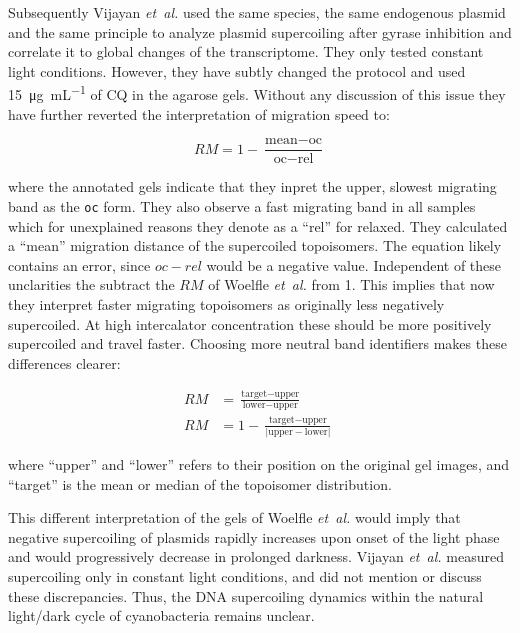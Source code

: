 \documentclass[10pt,a4]{article}
\newcommand{\ugml}{\micro\gram\per\milli\liter}
\newcommand{\etal}{\textit{et~al.}}
\begin{document}
Subsequently Vijayan \etal{} \cite{Vijayan2009} used the same species,
the same endogenous plasmid and the same principle to analyze plasmid
supercoiling after gyrase inhibition and correlate it to global
changes of the transcriptome. They only tested constant light
conditions.  However, they have subtly changed the protocol and used
\SI{15}{\ugml} of CQ in the agarose gels. Without any discussion of
this issue they have further reverted the interpretation of migration
speed to:

\begin{equation}
  RM = 1 - \frac{\text{mean} - \text{oc}}{\text{oc} - \text{rel}}
\end{equation}

where the annotated gels indicate that they inpret the upper, slowest
migrating band as the \texttt{oc} form. They also observe a fast
migrating band in all samples which for unexplained reasons they
denote as a ``rel'' for relaxed. They calculated a ``mean'' migration
distance of the supercoiled topoisomers. The equation likely contains
an error, since $oc-rel$ would be a negative value. Independent of
these unclarities the subtract the $RM$ of Woelfle \etal{} from
1. This implies that now they interpret faster migrating topoisomers
as originally less negatively supercoiled. At high intercalator
concentration these should be more positively supercoiled and travel
faster.
%
Choosing more neutral band identifiers makes these
differences clearer:

\begin{align}
  RM &= \frac{\text{target} - \text{upper}}{\text{lower} - \text{upper}}\\
  RM &=1-\frac{\text{target} - \text{upper}}{\lvert \text{upper} - \text{lower} \rvert}\,
\end{align}

where ``upper'' and ``lower'' refers to their position on the original gel
images, and ``target'' is the mean or median of the topoisomer distribution.

This different interpretation of the gels of Woelfle \etal{} would
imply that negative supercoiling of plasmids rapidly increases upon
onset of the light phase and would progressively decrease in prolonged
darkness.  Vijayan \etal{} measured supercoiling only in constant
light conditions, and did not mention or discuss these discrepancies.
Thus, the DNA supercoiling dynamics within the natural light/dark
cycle of cyanobacteria remains unclear.
\end{document}
